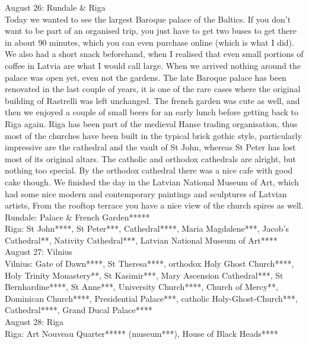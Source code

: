 August 26: Rundale \& Riga\\
Today we wanted to see the largest Baroque palace of the Baltics. If you don't want to be part of an organised trip, you just have to get two buses to get there in about 90 minutes, which you can even purchase online (which is what I did). We also had a short snack beforehand, when I realised that even small portions of coffee in Latvia are what I would call large. When we arrived nothing around the palace was open yet, even not the gardens. The late Baroque palace has been renovated in the last couple of years, it is one of the rare cases where the original building of Rastrelli was left unchanged. The french garden was cute as well, and then we enjoyed a couple of small beers for an early lunch before getting back to Riga again. Riga has been part of the medieval Hanse trading organisation, thus most of the churches have been built in the typical brick gothic style, particularly impressive are the cathedral and the vault of St John, whereas St Peter has lost most of its original altars. The catholic and orthodox cathedrals are alright, but nothing too special. By the orthodox cathedral there was a nice cafe with good cake though. We finished the day in the Latvian National Museum of Art, which had some nice modern and contemporary paintings and sculptures of Latvian artists, From the rooftop terrace you have a nice view of the church spires as well. \\

Rundale: Palace \& French Garden*****\\
Riga: St John****, St Peter***, Cathedral****, Maria Magdalene***, Jacob's Cathedral**, Nativity Cathedral***, Latvian National Museum of Art****\\

August 27: Vilnius\\

Vilnius: Gate of Dawn****, St Theresa****, orthodox Holy Ghost Church****, Holy Trinity Monastery**, St Kasimir***, Mary Ascension Cathedral***, St Bernhardine****, St Anne***, University Church****,
Church of Mercy**, Dominican Church****, Presidential Palace***, catholic Holy-Ghost-Church***, Cathedral****, Grand Ducal Palace****\\

August 28: Riga\\

Riga: Art Nouveau Quarter***** (museum***), House of Black Heads****\\

